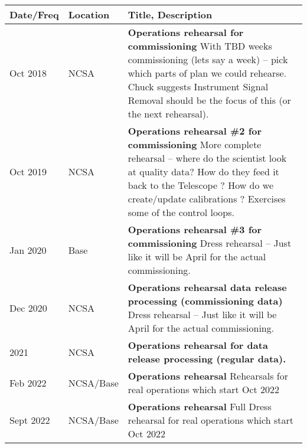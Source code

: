 \begin{longtable} {|l|l|p{}|}
	\hline
\textbf{Date/Freq} &\textbf{Location}& \textbf{Title, Description} \\ \hline

Oct 2018 &  NCSA & \textbf{Operations rehearsal for commissioning }
	With TBD weeks commissioning (lets say a week) -- pick which parts of plan we could rehearse.
	Chuck suggests Instrument Signal Removal should be the focus of this (or the next rehearsal).
	\\ \hline
Oct 2019 & NCSA &  \textbf{Operations rehearsal \#2 for commissioning}
More complete rehearsal -- where do the scientist look at quality data? How do they feed it back to the Telescope ?
How do we create/update calibrations ? Exercises some of the control loops.
\\ \hline
Jan 2020 & Base  &  \textbf{Operations rehearsal \#3 for commissioning}
Dress rehearsal -- Just like it will be April for the actual commissioning.
	\\ \hline
Dec 2020 &  NCSA &  \textbf{Operations rehearsal data release processing (commissioning data)}
	Dress rehearsal -- Just like it will be April for the actual commissioning.
	\\ \hline

2021 &  NCSA &  \textbf{Operations rehearsal for data release processing (regular data).}
	\\ \hline

Feb 2022 &  NCSA/Base &  \textbf{Operations rehearsal}
Rehearsals for real operations which start Oct 2022
	\\ \hline
Sept 2022 &  NCSA/Base &  \textbf{Operations rehearsal}
Full Dress rehearsal for real operations which start Oct 2022
	\\ \hline


\end{longtable}
